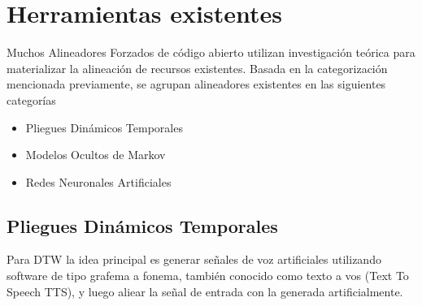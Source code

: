 
\section{Herramientas existentes}

Muchos Alineadores Forzados de código abierto utilizan investigación teórica para materializar la alineación de recursos existentes. Basada en la categorización mencionada previamente, se agrupan alineadores existentes en las siguientes categorías

\begin{itemize}
    \item Pliegues Dinámicos Temporales
    \item Modelos Ocultos de Markov
    \item Redes Neuronales Artificiales
\end{itemize}

\subsection{Pliegues Dinámicos Temporales}

Para DTW la idea principal es generar señales de voz artificiales utilizando software de tipo grafema a fonema, también conocido como texto a vos (Text To Speech TTS), y luego aliear la señal de entrada con la generada artificialmente.


